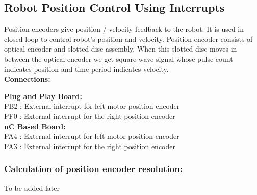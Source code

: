 \documentclass[a4paper,12pt,oneside]{article}
\begin{document}
		\subsection{\huge \textbf{Robot Position Control Using Interrupts}}
			{Position encoders give position / velocity feedback to the robot. It is used in closed loop to control robot’s position and velocity.  Position encoder consists of optical  encoder and slotted disc assembly. When this slotted disc moves in between the optical encoder we get square wave signal whose pulse  count  indicates  position  and  time  period indicates  velocity.}\\
			
			\textbf{Connections:\\}
			\begin{center}
				
				\textbf{Plug and Play Board:}\\
				PB2 : External interrupt for left motor position encoder\\
				PF0 : External interrupt for the right position encoder\\
			
				\textbf{uC Based Board:}\\
				PA4 : External interrupt for left motor position encoder\\
				PA3 : External interrupt for the right position encoder\\
			\end{center}
			\subsubsection{\textbf{Calculation of position encoder resolution:}}	
			To be added later
			
\end{document}
